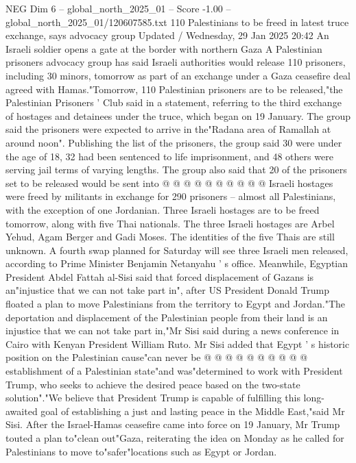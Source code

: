 \begin{textsample}{NEG Dim 6 – global\_north\_2025\_01 – Score -1.00 – global\_north\_2025\_01/120607585.txt}  \label{ex:f6_neg_177}
110 Palestinians to be freed in latest truce exchange, says advocacy group Updated / Wednesday, 29 Jan 2025 20:42 An Israeli soldier opens a gate at the border with northern Gaza A Palestinian prisoners advocacy group has said Israeli authorities would release 110 prisoners, including 30 minors, tomorrow as part of an exchange under a Gaza ceasefire deal agreed with Hamas."Tomorrow, 110 Palestinian prisoners are to be released,"the Palestinian Prisoners ' Club said in a statement, referring to the third exchange of hostages and detainees under the truce, which began on 19 January.
The group said the prisoners were expected to arrive in the"Radana area of Ramallah at around noon".
Publishing the list of the prisoners, the group said 30 were under the age of 18, 32 had been sentenced to life imprisonment, and 48 others were serving jail terms of varying lengths.
The group also said that 20 of the prisoners set to be released would be sent into @ @ @ @ @ @ @ @ @ @ Israeli hostages were freed by militants in exchange for 290 prisoners -- almost all Palestinians, with the exception of one Jordanian.
Three Israeli hostages are to be freed tomorrow, along with five Thai nationals.
The three Israeli hostages are Arbel Yehud, Agam Berger and Gadi Moses.
The identities of the five Thais are still unknown.
A fourth swap planned for Saturday will see three Israeli men released, according to Prime Minister Benjamin Netanyahu ' s office.
Meanwhile, Egyptian President Abdel Fattah al-Sisi said that forced displacement of Gazans is an"injustice that we can not take part in", after US President Donald Trump floated a plan to move Palestinians from the territory to Egypt and Jordan."The deportation and displacement of the Palestinian people from their land is an injustice that we can not take part in,"Mr Sisi said during a news conference in Cairo with Kenyan President William Ruto.
Mr Sisi added that Egypt ' s historic position on the Palestinian cause"can never be @ @ @ @ @ @ @ @ @ @ establishment of a Palestinian state"and was"determined to work with President Trump, who seeks to achieve the desired peace based on the two-state solution"."We believe that President Trump is capable of fulfilling this long-awaited goal of establishing a just and lasting peace in the Middle East,"said Mr Sisi.
After the Israel-Hamas ceasefire came into force on 19 January, Mr Trump touted a plan to"clean out"Gaza, reiterating the idea on Monday as he called for Palestinians to move to"safer"locations such as Egypt or Jordan.

\end{textsample}
